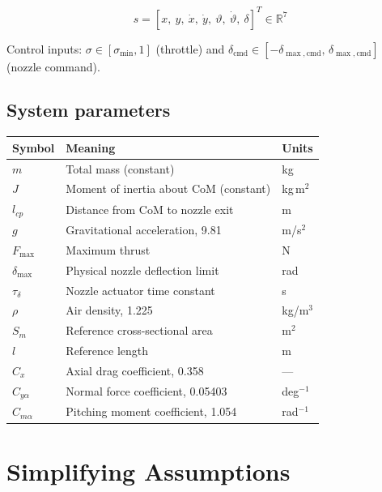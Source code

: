 \documentclass[11pt,a4paper]{article}
\theoremstyle{plain}
\theoremstyle{remark}
\newcommand{\vth}{\vartheta}
\newcommand{\dmax}{\delta_{\max}}
\newcommand{\dcmd}{\delta_{\mathrm{cmd}}}
\newcommand{\Fmax}{F_{\max}}
\begin{document}
\[
  s = [x,\ y,\ \dot x,\ \dot y,\ \vth,\ \dot\vth,\ \delta]^T \in \mathbb{R}^7
\]

Control inputs: $\sigma \in [\sigma_{\min}, 1]$ (throttle) and $\dcmd \in [-\delta_{\max,\mathrm{cmd}},\, \delta_{\max,\mathrm{cmd}}]$ (nozzle command).

\subsection*{System parameters}

\begin{center}
\begin{tabular}{lll}
\toprule
Symbol & Meaning & Units \\
\midrule
$m$           & Total mass (constant)                         & kg \\
$J$           & Moment of inertia about CoM (constant)        & kg\,m$^2$ \\
$l_{cp}$      & Distance from CoM to nozzle exit             & m \\
$g$           & Gravitational acceleration, 9.81              & m/s$^2$ \\
$\Fmax$       & Maximum thrust                                & N \\
$\dmax$       & Physical nozzle deflection limit              & rad \\
$\tau_\delta$ & Nozzle actuator time constant                 & s \\
$\rho$        & Air density, 1.225                            & kg/m$^3$ \\
$S_m$         & Reference cross-sectional area                & m$^2$ \\
$l$           & Reference length                              & m \\
$C_x$         & Axial drag coefficient, 0.358                 & --- \\
$C_{y\alpha}$ & Normal force coefficient, 0.05403             & deg$^{-1}$ \\
$C_{m\alpha}$ & Pitching moment coefficient, 1.054            & rad$^{-1}$ \\
\bottomrule
\end{tabular}
\end{center}

\section{Simplifying Assumptions}
\end{document}
